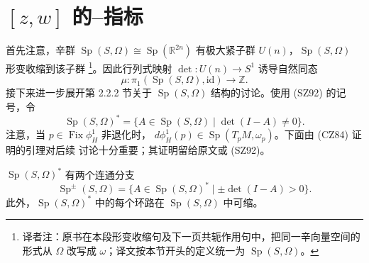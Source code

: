 \section{\texorpdfstring{$[z,w]$ 的\personConley{}--\personZehnder{}指标}{[z,w] 的康利--曾德尔指标}}
\label{sec:conley-zehnder-index-capped-orbit}

首先注意，辛群 $\operatorname{Sp}(S,\Omega)\cong\operatorname{Sp}(\mathbb R^{2n})$
有极大紧子群 $U(n)$，$\operatorname{Sp}(S,\Omega)$ 形变收缩到该子群
\footnote{译者注：原书在本段形变收缩句及下一页共轭作用句中，把同一辛向量空间的
形式从 $\Omega$ 改写成 $\omega$；译文按本节开头的定义统一为
$\operatorname{Sp}(S,\Omega)$。}。因此行列式映射
$\det:U(n)\to S^1$ 诱导自然同态
\[
 \mu:\pi_1(\operatorname{Sp}(S,\Omega),\mathrm{id})\longrightarrow\mathbb Z.
\]
接下来进一步展开第 2.2.2 节关于 $\operatorname{Sp}(S,\Omega)$ 结构的讨论。使用
(SZ92) 的记号，令
\[
 \operatorname{Sp}(S,\Omega)^*=
 \{A\in\operatorname{Sp}(S,\Omega)\mid\det(I-A)\neq0\}.
\]
注意，当 $p\in\operatorname{Fix}\phi_H^1$ 非退化时，
$d\phi_H^1(p)\in\operatorname{Sp}(T_pM,\omega_p)$。下面由 (CZ84) 证明的引理对后续
讨论十分重要；其证明留给原文或 (SZ92)。

\begin{lemma}
\label{lem:18-symplectic-group-star-components}
$\operatorname{Sp}(S,\Omega)^*$ 有两个连通分支
\[
 \operatorname{Sp}^{\pm}(S,\Omega)=
 \{A\in\operatorname{Sp}(S,\Omega)^*\mid
   \pm\det(I-A)>0\}.
\]
此外，$\operatorname{Sp}(S,\Omega)^*$ 中的每个环路在
$\operatorname{Sp}(S,\Omega)$ 中可缩。
\end{lemma}

